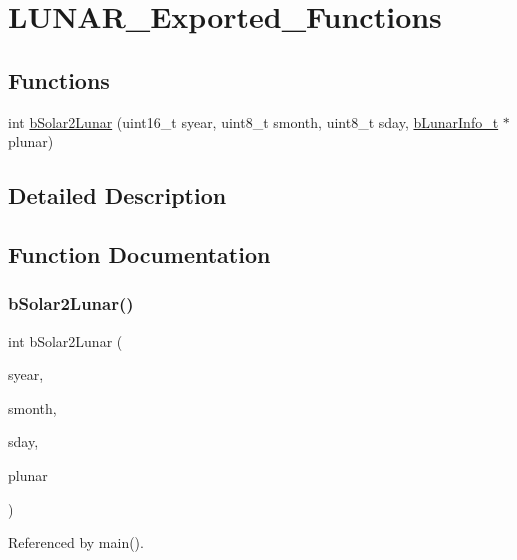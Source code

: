 \hypertarget{group___l_u_n_a_r___exported___functions}{}\section{L\+U\+N\+A\+R\+\_\+\+Exported\+\_\+\+Functions}
\label{group___l_u_n_a_r___exported___functions}
\subsection*{Functions}
\begin{DoxyCompactItemize}
\item 
int \mbox{\hyperlink{group___l_u_n_a_r___exported___functions_ga2e56b0cadb491906cddfebe953e796a9}{b\+Solar2\+Lunar}} (uint16\+\_\+t syear, uint8\+\_\+t smonth, uint8\+\_\+t sday, \mbox{\hyperlink{structb_lunar_info__t}{b\+Lunar\+Info\+\_\+t}} $\ast$plunar)
\end{DoxyCompactItemize}


\subsection{Detailed Description}


\subsection{Function Documentation}
\mbox{\label{group___l_u_n_a_r___exported___functions_ga2e56b0cadb491906cddfebe953e796a9}} 
\subsubsection{\texorpdfstring{b\+Solar2\+Lunar()}{bSolar2Lunar()}}
{\footnotesize\ttfamily int b\+Solar2\+Lunar (\begin{DoxyParamCaption}\item[{uint16\+\_\+t}]{syear,  }\item[{uint8\+\_\+t}]{smonth,  }\item[{uint8\+\_\+t}]{sday,  }\item[{\mbox{\hyperlink{structb_lunar_info__t}{b\+Lunar\+Info\+\_\+t}} $\ast$}]{plunar }\end{DoxyParamCaption})}



Referenced by main().

